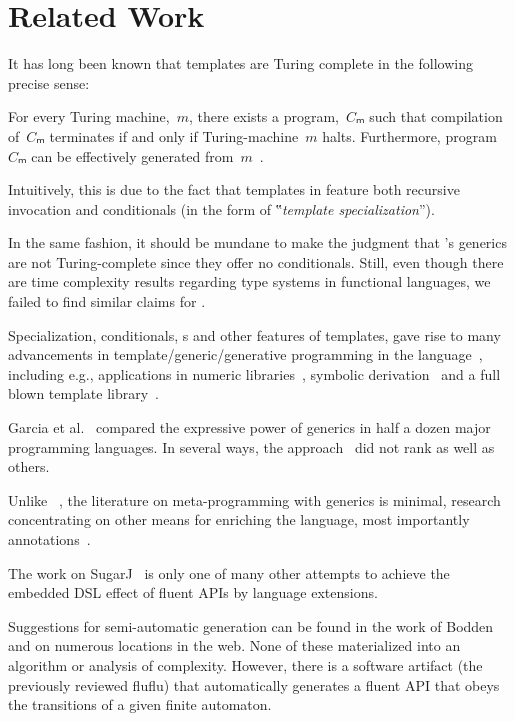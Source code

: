 \section{Related Work}

It has long been known
  that \CC templates are Turing complete in the following precise sense:

\begin{Proposition}
  \label{Theorem:Gutterman}
  For every Turing machine,~$m$, there exists a \CC program,~$Cₘ$ such that
    compilation of~$Cₘ$ terminates if and only if
      Turing-machine~$m$ halts.
      Furthermore, program~$Cₘ$ can be effectively generated from~$m$~\cite{Gutterman:2003}.
\end{Proposition}

Intuitively, this is due to the fact that templates in \CC
  feature both recursive invocation and conditionals (in the form of
  ‟\emph{template specialization}”).

In the same fashion, it should be mundane to make the judgment that
  \Java's generics are not Turing-complete since they offer no conditionals.
Still, even though there are time complexity results regarding type systems in functional
  languages, we failed to find similar claims for \Java.

Specialization, conditionals, s and other features of \CC templates,
  gave rise to many advancements in template/generic/generative programming
  in the language~\cite{Austern:98,Musser:Stepanov:1989,Backhouse:Jansson:1999,Dehnert:Stepanov:2000},
  including e.g., applications in numeric libraries~\cite{Veldhuizen:95,Vandevoorde:Josuttis:02},
  symbolic derivation~\cite{Gil:Gutterman:98}
  and a full blown template library~\cite{Abrahams:Gurtovoy:04}.

Garcia et al.~\cite{Garcia:Jarvi:Lumsdaine:Siek:Willcock:03} compared
  the expressive power of generics in half a dozen major programming languages.
  In several ways, the \Java approach~\cite{Bracha:Odersky:Stoutamire:Wadler:98}
  did not rank as well as others.

Unlike \CC~\cite{Austern:98,Musser:Stepanov:1989, Backhouse:Jansson:1999,
Dehnert:Stepanov:2000,Gil:Gutterman:98,Abrahams:Gurtovoy:04}, the literature on
meta-programming with \Java generics is minimal, research concentrating on
other means for enriching the language, most importantly
annotations~\cite{Papi:08}.

The work on SugarJ~\cite{Erdweg:2011} is only one of many other attempts
  to achieve the embedded DSL effect of fluent APIs by language extensions.

Suggestions for semi-automatic generation can be found in the work of
Bodden~\cite{Bodden:14} and on numerous locations in the web. None of these
materialized into an algorithm or analysis of complexity. However, there is a
software artifact (the previously reviewed
fluflu) that automatically generates a
fluent API that obeys the transitions of a given finite automaton.
